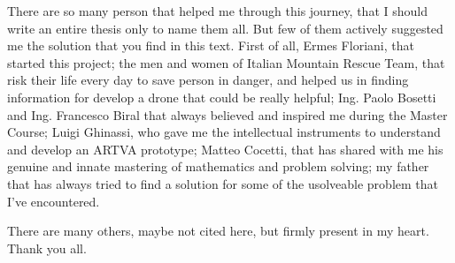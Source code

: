 \begin{aknowledgements}
\noindent
There are so many person that helped me through this journey, that I should write an entire thesis only to name them all. But few of them actively suggested me the solution that you find in this text. First of all, Ermes Floriani, that started this project; the men and women of Italian Mountain Rescue Team, that risk their life every day to save person in danger, and helped us in finding information for develop a drone that could be really helpful; Ing. Paolo Bosetti and Ing. Francesco Biral that always believed and inspired me during the Master Course; Luigi Ghinassi, who gave me the intellectual instruments to understand and develop an ARTVA prototype; Matteo Cocetti, that has shared with me his genuine and innate mastering of mathematics and problem solving; my father that has always tried to find a solution for some of the usolveable problem that I've encountered.

\noindent
There are many others, maybe not cited here, but firmly present in my heart. Thank you all.
\end{aknowledgements}
